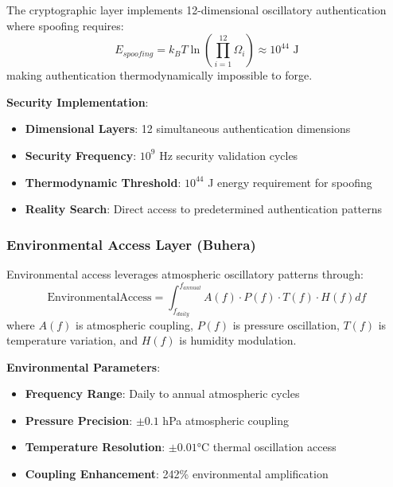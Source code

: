 ﻿\documentclass[11pt,a4paper]{article}
\begin{document}
\begin{itemize}
\begin{itemize}
\begin{definition}
The cryptographic layer implements 12-dimensional oscillatory authentication where spoofing requires:
\begin{equation}
E_{spoofing} = k_B T \ln\left(\prod_{i=1}^{12} \Omega_i\right) \approx 10^{44} \text{ J}
\end{equation}
making authentication thermodynamically impossible to forge.
\end{definition}

\textbf{Security Implementation}:
\begin{itemize}
\item \textbf{Dimensional Layers}: 12 simultaneous authentication dimensions
\item \textbf{Security Frequency}: $10^9$ Hz security validation cycles
\item \textbf{Thermodynamic Threshold}: $10^{44}$ J energy requirement for spoofing
\item \textbf{Reality Search}: Direct access to predetermined authentication patterns
\end{itemize}

\subsubsection{Environmental Access Layer (Buhera)}

\begin{definition}
Environmental access leverages atmospheric oscillatory patterns through:
\begin{equation}
\text{EnvironmentalAccess} = \int_{f_{daily}}^{f_{annual}} A(f) \cdot P(f) \cdot T(f) \cdot H(f) df
\end{equation}
where $A(f)$ is atmospheric coupling, $P(f)$ is pressure oscillation, $T(f)$ is temperature variation, and $H(f)$ is humidity modulation.
\end{definition}

\textbf{Environmental Parameters}:
\begin{itemize}
\item \textbf{Frequency Range}: Daily to annual atmospheric cycles
\item \textbf{Pressure Precision}: $\pm 0.1$ hPa atmospheric coupling
\item \textbf{Temperature Resolution}: $\pm 0.01$°C thermal oscillation access
\item \textbf{Coupling Enhancement}: 242\% environmental amplification
\end{itemize}


\end{itemize}
\end{itemize}
\end{document}
